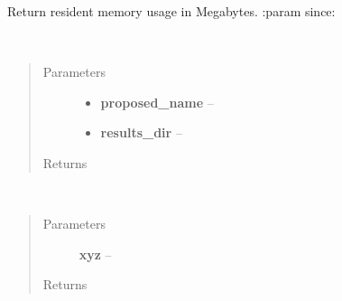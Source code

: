 \documentclass[letterpaper,10pt,english]{sphinxmanual}
\begin{document}

\begin{fulllineitems}
\label{index:aietes.Tools.resident}
Return resident memory usage in Megabytes.
:param since:

\end{fulllineitems}


\begin{fulllineitems}
\label{index:aietes.Tools.results_file}~\begin{quote}\begin{description}
\item[{Parameters}] \leavevmode\begin{itemize}
\item {} 
\textbf{proposed\_name} -- 

\item {} 
\textbf{results\_dir} -- 

\end{itemize}

\item[{Returns}] \leavevmode


\end{description}\end{quote}

\end{fulllineitems}


\begin{fulllineitems}
\label{index:aietes.Tools.sixvec}~\begin{quote}\begin{description}
\item[{Parameters}] \leavevmode
\textbf{xyz} -- 

\item[{Returns}] \leavevmode


\end{description}\end{quote}

\end{fulllineitems}
\end{document}
